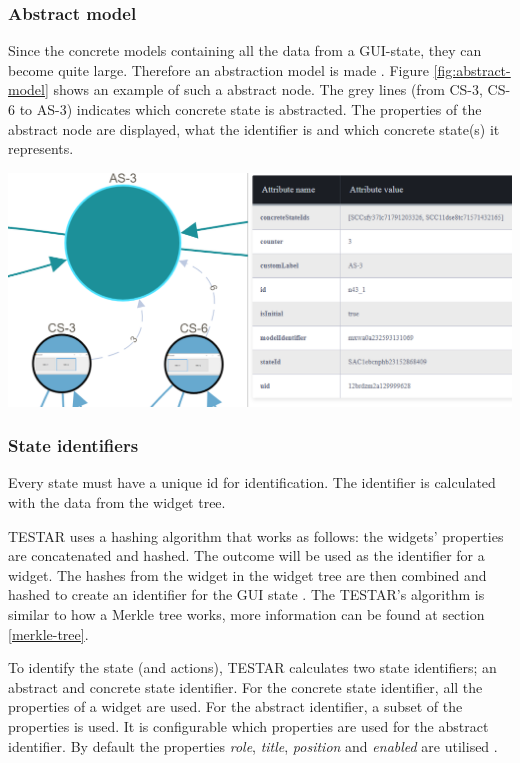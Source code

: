 \newpage
\subsubsection{Abstract model} \label{abstract-model}
Since the concrete models containing all the data from a GUI-state, they can become quite large.  Therefore an abstraction model is made \cite{thesisMulders}. Figure \ref{fig:abstract-model} shows an example of such a abstract node. The grey lines (from CS-3, CS-6 to AS-3) indicates which concrete state is abstracted. The properties of the abstract node are displayed, what the identifier is and which concrete state(s) it represents.

\bigskip
\begingroup
\captionsetup{type=figure}
\includegraphics[scale=0.5]{images/abstract-model.png}
\label{fig:abstract-model}
\endgroup

\subsubsection{State identifiers} \label{state-identifiers}
Every state must have a unique id for identification. The identifier is calculated with the data from the widget tree. 

TESTAR uses a hashing algorithm that works as follows: the widgets' properties are concatenated and hashed. The outcome will be used as the identifier for a widget. The hashes from the widget in the widget tree are then combined and hashed to create an identifier for the GUI state \cite{VosAho2021}. The TESTAR's algorithm is similar to how a Merkle tree works, more information can be found at section \ref{merkle-tree}.

To identify the state (and actions), TESTAR calculates two state identifiers; an abstract and concrete state identifier. For the concrete state identifier, all the properties of a widget are used. For the abstract identifier, a subset of the properties is used. It is configurable which properties are used for the abstract identifier. By default the properties \textit{role}, \textit{title}, \textit{position} and \textit{enabled} are utilised \cite{VosAho2021, thesisMulders}.

